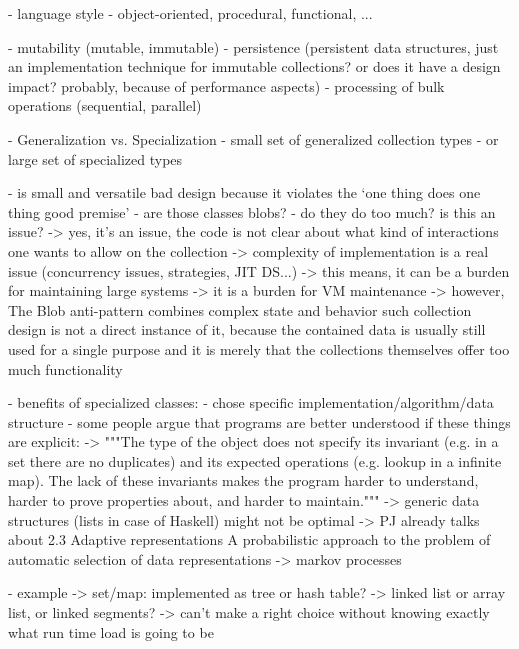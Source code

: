 \documentclass[sigconf, 10pt]{acmart}
\begin{document}
\begin{note}
  - language style
    - object-oriented, procedural, functional, ...
  
  - mutability (mutable, immutable)
  - persistence (persistent data structures, just an implementation technique for immutable collections? or does it have a design impact? probably, because of performance aspects)
  - processing of bulk operations (sequential, parallel)


  - Generalization vs. Specialization  
  - small set of generalized collection types 
  - or large set of specialized types
  
  - is small and versatile bad design because it violates the `one thing does   one thing good premise'
    - are those classes blobs? \citep{brown1998antipatterns}
    - do they do too much? is this an issue?
     -> yes, it's an issue, the code is not clear about what kind of 
        interactions one wants to allow on the collection
     -> complexity of implementation is a real issue (concurrency issues,
        strategies, JIT DS...)
     -> this means, it can be a burden for maintaining large systems
     -> it is a burden for VM maintenance
     -> however, The Blob anti-pattern combines complex state and behavior
        such collection design is not a direct instance of it, because
        the contained data is usually still used for a single purpose and
        it is merely that the collections themselves offer too much
        functionality

    - benefits of specialized classes:
      - chose specific implementation/algorithm/data structure
      - some people argue that programs are better understood if these things are explicit: \citep{PeytonJones:1996:BTC}
        -> """The type of the object does not specify its invariant (e.g. in a set there are no duplicates) and its expected operations (e.g. lookup in a infinite map). The lack of these invariants makes the program harder to understand, harder to prove properties about, and harder to maintain."""
        -> generic data structures (lists in case of Haskell) might not be optimal
         -> PJ already talks about 2.3 Adaptive representations
         A probabilistic approach to the problem of automatic selection of data representations \citep{Chuang:1996:PAP}
          -> markov processes

      - example
        -> set/map: implemented as tree or hash table?
        -> linked list or array list, or linked segments?
        -> can't make a right choice without knowing exactly what
           run time load is going to be


\end{note}
\end{document}
